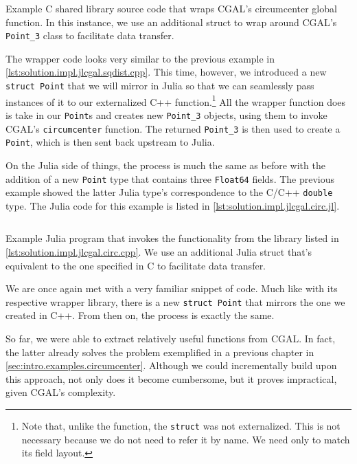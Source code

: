 \begin{listing}[htbp]
  \inputminted{cpp}{cpp/circ.cpp}
  \caption[C wrapper for circumcenter functionality]{
    Example C shared library source code that wraps \ac{CGAL}'s circumcenter
    global function.  In this instance, we use an additional struct to wrap
    around \ac{CGAL}'s \texttt{Point\_3} class to facilitate data transfer.}%
  \label{lst:solution.impl.jlcgal.circ.cpp}
\end{listing}

The wrapper code looks very similar to the previous example in
\cref{lst:solution.impl.jlcgal.sqdist.cpp}.  This time, however, we introduced a
new \texttt{struct Point} that we will mirror in Julia so that we can
seamlessly pass instances of it to our externalized C++ function.\footnote{Note
that, unlike the function, the \texttt{struct} was not externalized.
This is not necessary because we do not need to refer it by name.  We need only
to match its field layout.}  All the wrapper function does is take in our
\texttt{Point}s and creates new \texttt{Point\_3} objects, using them to invoke
\ac{CGAL}'s \texttt{circumcenter} function.  The returned \texttt{Point\_3} is
then used to create a \texttt{Point}, which is then sent back upstream to Julia.

On the Julia side of things, the process is much the same as before with the
addition of a new \texttt{Point} type that contains three
\texttt{Float64} fields. The previous example showed the latter Julia
type's correspondence to the C/C++ \texttt{double} type.  The Julia code
for this example is listed in \cref{lst:solution.impl.jlcgal.circ.jl}.

\begin{listing}[htb]
  \inputminted{julia}{jl/circ.jl}
  \caption[Julia circumcenter example program]{
    Example Julia program that invokes the functionality from the library listed
    in \cref{lst:solution.impl.jlcgal.circ.cpp}.  We use an additional Julia
    struct that's equivalent to the one specified in C to facilitate data
    transfer.}%
  \label{lst:solution.impl.jlcgal.circ.jl}
\end{listing}

We are once again met with a very familiar snippet of code.  Much like with its
respective wrapper library, there is a new \texttt{struct Point} that
mirrors the one we created in C++.  From then on, the process is exactly the
same.

So far, we were able to extract relatively useful functions from \ac{CGAL}.  In
fact, the latter already solves the problem exemplified in a previous chapter in
\cref{sec:intro.examples.circumcenter}.  Although we could incrementally build
upon this approach, not only does it become cumbersome, but it proves
impractical, given \ac{CGAL}'s complexity.

